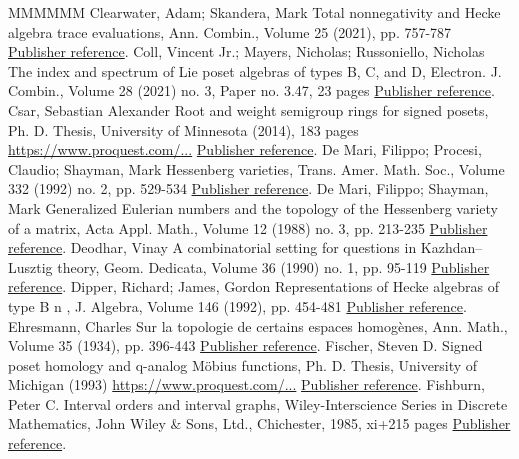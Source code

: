 \documentclass[11pt]{article}
\theoremstyle{definition}
\numberwithin{equation}{section}
\begin{document}
\begin{thebibliography}{MMMMMM}
 Clearwater, Adam; Skandera, Mark Total nonnegativity and Hecke algebra trace evaluations, Ann. Combin., Volume 25 (2021), pp. 757-787 \href{https://alco.centre-mersenne.org/articles/10.5802/alco.459/#CSkanTNNChar}{Publisher reference}.
 Coll, Vincent Jr.; Mayers, Nicholas; Russoniello, Nicholas The index and spectrum of Lie poset algebras of types B, C, and D, Electron. J. Combin., Volume 28 (2021) no. 3, Paper no. 3.47, 23 pages \href{https://alco.centre-mersenne.org/articles/10.5802/alco.459/#CMRIndexSpec}{Publisher reference}.
 Csar, Sebastian Alexander Root and weight semigroup rings for signed posets, Ph. D. Thesis, University of Minnesota (2014), 183 pages \url{https://www.proquest.com/...} \href{https://alco.centre-mersenne.org/articles/10.5802/alco.459/#CsarThesis}{Publisher reference}.
 De Mari, Filippo; Procesi, Claudio; Shayman, Mark Hessenberg varieties, Trans. Amer. Math. Soc., Volume 332 (1992) no. 2, pp. 529-534 \href{https://alco.centre-mersenne.org/articles/10.5802/alco.459/#DPSHessenberg}{Publisher reference}.
 De Mari, Filippo; Shayman, Mark Generalized Eulerian numbers and the topology of the Hessenberg variety of a matrix, Acta Appl. Math., Volume 12 (1988) no. 3, pp. 213-235 \href{https://alco.centre-mersenne.org/articles/10.5802/alco.459/#DSGenEuler}{Publisher reference}.
 Deodhar, Vinay A combinatorial setting for questions in Kazhdan–Lusztig theory, Geom. Dedicata, Volume 36 (1990) no. 1, pp. 95-119 \href{https://alco.centre-mersenne.org/articles/10.5802/alco.459/#Deodhar90}{Publisher reference}.
 Dipper, Richard; James, Gordon Representations of Hecke algebras of type B n , J. Algebra, Volume 146 (1992), pp. 454-481 \href{https://alco.centre-mersenne.org/articles/10.5802/alco.459/#DJRepHeckeB}{Publisher reference}.
 Ehresmann, Charles Sur la topologie de certains espaces homogènes, Ann. Math., Volume 35 (1934), pp. 396-443 \href{https://alco.centre-mersenne.org/articles/10.5802/alco.459/#Ehresmann}{Publisher reference}.
 Fischer, Steven D. Signed poset homology and q-analog Möbius functions, Ph. D. Thesis, University of Michigan (1993) \url{https://www.proquest.com/...} \href{https://alco.centre-mersenne.org/articles/10.5802/alco.459/#SFischerThesis}{Publisher reference}.
 Fishburn, Peter C. Interval orders and interval graphs, Wiley-Interscience Series in Discrete Mathematics, John Wiley \& Sons, Ltd., Chichester, 1985, xi+215 pages \href{https://alco.centre-mersenne.org/articles/10.5802/alco.459/#Fish}{Publisher reference}.

\end{thebibliography}
\end{document}
